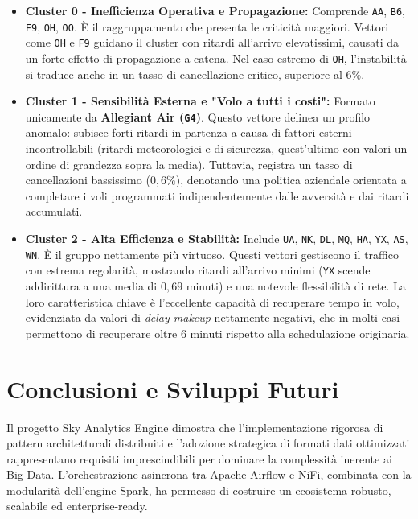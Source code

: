 \documentclass[conference]{IEEEtran}
\begin{document}
\begin{itemize}
    \item \textbf{Cluster 0 - Inefficienza Operativa e Propagazione:} Comprende \texttt{AA}, \texttt{B6}, \texttt{F9}, \texttt{OH}, \texttt{OO}.
    È il raggruppamento che presenta le criticità maggiori.
    Vettori come \texttt{OH} e \texttt{F9} guidano il cluster con ritardi all'arrivo elevatissimi, causati da un forte effetto di propagazione a catena.
    Nel caso estremo di \texttt{OH}, l'instabilità si traduce anche in un tasso di cancellazione critico, superiore al $6\%$.
    \item \textbf{Cluster 1 - Sensibilità Esterna e "Volo a tutti i costi":} Formato unicamente da \textbf{Allegiant Air (\texttt{G4})}.
    Questo vettore delinea un profilo anomalo: subisce forti ritardi in partenza a causa di fattori esterni incontrollabili (ritardi meteorologici e di sicurezza, quest'ultimo con valori un ordine di grandezza sopra la media).
    Tuttavia, registra un tasso di cancellazioni bassissimo ($0,6\%$), denotando una politica aziendale orientata a completare i voli programmati indipendentemente dalle avversità e dai ritardi accumulati.
    \item \textbf{Cluster 2 - Alta Efficienza e Stabilità:} Include \texttt{UA}, \texttt{NK}, \texttt{DL}, \texttt{MQ}, \texttt{HA}, \texttt{YX}, \texttt{AS}, \texttt{WN}.
    È il gruppo nettamente più virtuoso.
    Questi vettori gestiscono il traffico con estrema regolarità, mostrando ritardi all'arrivo minimi (\texttt{YX} scende addirittura a una media di $0,69$ minuti) e una notevole flessibilità di rete.
    La loro caratteristica chiave è l'eccellente capacità di recuperare tempo in volo, evidenziata da valori di \textit{delay makeup} nettamente negativi, che in molti casi permettono di recuperare oltre $6$ minuti rispetto alla schedulazione originaria.
\end{itemize}


\section{Conclusioni e Sviluppi Futuri}\label{sec:conclusions_future_work}
Il progetto Sky Analytics Engine dimostra che l'implementazione rigorosa di pattern architetturali distribuiti e l'adozione strategica di formati dati ottimizzati rappresentano requisiti imprescindibili per dominare la complessità inerente ai Big Data.
L'orchestrazione asincrona tra Apache Airflow e NiFi, combinata con la modularità dell'engine Spark, ha permesso di costruire un ecosistema robusto, scalabile ed enterprise-ready.
\end{document}
